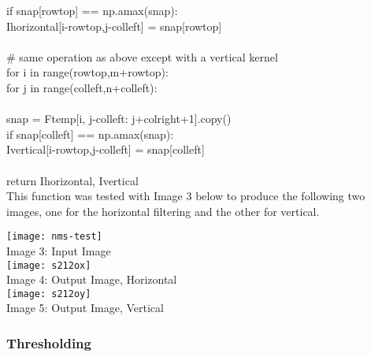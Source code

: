 \documentclass{article}
\begin{document}
	\indent \indent \indent if snap[row\textunderscore top] == np.amax(snap):\\
	\indent \indent \indent \indent I\textunderscore horizontal[i-row\textunderscore top,j-col\textunderscore left] = snap[row\textunderscore top]\\
	\\
	\indent \# same operation as above except with a vertical kernel\\
	\indent for i in range(row\textunderscore top,m+row\textunderscore top):\\
	\indent \indent for j in range(col\textunderscore left,n+col\textunderscore left):\\
	\\
	\indent \indent \indent snap = F\textunderscore temp[i, j-col\textunderscore left: j+col\textunderscore right+1].copy()\\
	\indent \indent \indent if snap[col\textunderscore left] == np.amax(snap):\\
	\indent \indent \indent \indent I\textunderscore vertical[i-row\textunderscore top,j-col\textunderscore left] = snap[col\textunderscore left]\\
	\\
	return I\textunderscore horizontal, I\textunderscore vertical\\
	
	This function was tested with Image 3 below to produce the following two images, one for the horizontal filtering and the other for vertical.\\
	
		\begin{center}
		\noindent \texttt{[image: nms-test]}\\
		Image 3: Input Image\\
		
		\texttt{[image: s212ox]}\\
		Image 4: Output Image, Horizontal\\
		
		\texttt{[image: s212oy]}\\
		Image 5: Output Image, Vertical\\
		
		\end{center}
	
	\subsubsection{Thresholding}
	
\end{document}
